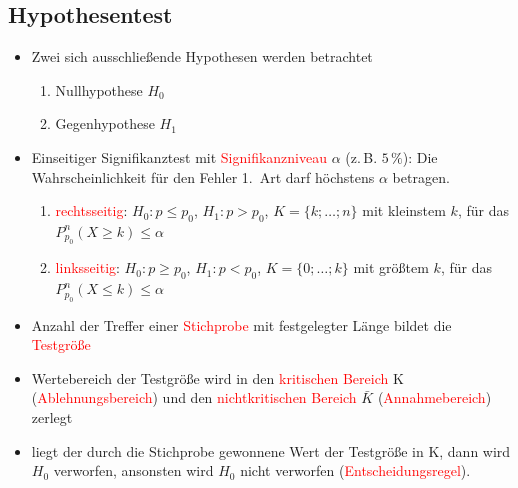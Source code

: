 \subsection{Hypothesentest}
\begin{itemize}
\item Zwei sich ausschließende Hypothesen werden betrachtet\\
\begin{enumerate}
\item Nullhypothese $H_0$ \item Gegenhypothese $H_1$
\end{enumerate}
\item Einseitiger Signifikanztest mit \textcolor{red}{Signifikanzniveau} $\alpha$ (z.\,B. $5\,\%$): Die Wahrscheinlichkeit für den Fehler 1.~Art darf höchstens $\alpha$ betragen.\\
\begin{enumerate}
\item \textcolor{red}{rechtsseitig}: $H_0\colon p \leq p_0$, $H_1\colon p > p_0$, $K = \{k; \ldots; n\}$ mit kleinstem $k$, für das $P_{p_0}^n(X\geq k) \leq \alpha$\\
\item \textcolor{red}{linksseitig}: $H_0\colon p \geq p_0$, $H_1\colon p < p_0$, $K = \{0; \ldots; k\}$ mit größtem $k$, für das $P_{p_0}^n(X\leq k) \leq \alpha$
\end{enumerate}
\item Anzahl der Treffer einer \textcolor{red}{Stichprobe} mit festgelegter Länge bildet die \textcolor{red}{Testgröße}
\item Wertebereich der Testgröße wird in den \textcolor{red}{kritischen Bereich} K (\textcolor{red}{Ablehnungsbereich}) und den \textcolor{red}{nichtkritischen Bereich} $\bar{K}$  (\textcolor{red}{Annahmebereich}) zerlegt
\item liegt der durch die Stichprobe gewonnene Wert der Testgröße in K, dann wird $H_0$ verworfen, ansonsten wird $H_0$ nicht verworfen (\textcolor{red}{Entscheidungsregel}). 


\end{itemize}
